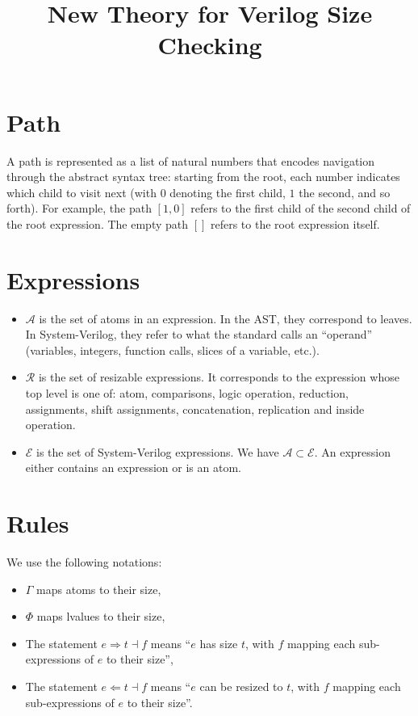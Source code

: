 \documentclass{article}
\title{New Theory for Verilog Size Checking}
\date{}
\author{}
\newcommand{\Syn}{\ensuremath{\Rightarrow}}
\newcommand{\Chk}{\ensuremath{\Leftarrow}}
\newcommand{\s}[3]{\ensuremath{#1 \Syn{} #2 \dashv{} #3}}
\renewcommand{\c}[3]{\ensuremath{#1 \Chk{} #2 \dashv{} #3}}
\begin{document}
\maketitle

\section*{Path}
A path is represented as a list of natural numbers that encodes
navigation through the abstract syntax tree: starting from the root, each number
indicates which child to visit next (with $0$ denoting the first child, $1$
the second, and so forth). For example, the path $[1, 0]$ refers to the first
child of the second child of the root expression.
The empty path $[]$ refers to the root expression itself.

\section*{Expressions}

\begin{itemize}
  \item $\mathcal{A}$ is the set of atoms in an expression. In the AST, they
    correspond to leaves. In System-Verilog, they refer to what the standard
    calls an ``operand'' (variables, integers, function calls, slices of a
    variable, etc.).
  \item $\mathcal{R}$ is the set of resizable expressions. It corresponds to the
    expression whose top level is one of: atom, comparisons, logic
    operation, reduction, assignments, shift assignments, concatenation,
    replication and inside operation.
  \item $\mathcal{E}$ is the set of System-Verilog expressions. We have
    $\mathcal{A} \subset \mathcal{E}$. An expression either contains an
    expression or is an atom.
\end{itemize}

\section*{Rules}
We use the following notations:
\begin{itemize}
  \item $\Gamma$ maps atoms to their size,
  \item $\Phi$ maps lvalues to their size,
  \item The statement $\s{e}{t}{f}$ means ``$e$ has size $t$, with $f$ mapping
    each sub-expressions of $e$ to their size'',
  \item The statement $\c{e}{t}{f}$ means ``$e$ can be resized to $t$, with $f$
    mapping each sub-expressions of $e$ to their size''.
\end{itemize}
\end{document}
